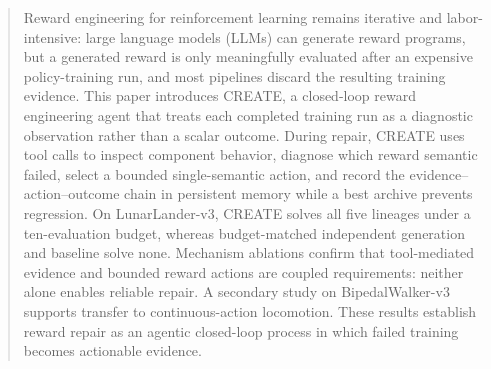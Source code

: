 \begin{abstract}
Reward engineering for reinforcement learning remains iterative and labor-intensive: large language models (LLMs) can generate reward programs, but a generated reward is only meaningfully evaluated after an expensive policy-training run, and most pipelines discard the resulting training evidence. This paper introduces CREATE, a closed-loop reward engineering agent that treats each completed training run as a diagnostic observation rather than a scalar outcome. During repair, CREATE uses tool calls to inspect component behavior, diagnose which reward semantic failed, select a bounded single-semantic action, and record the evidence--action--outcome chain in persistent memory while a best archive prevents regression. On LunarLander-v3, CREATE solves all five lineages under a ten-evaluation budget, whereas budget-matched independent generation and baseline solve none. Mechanism ablations confirm that tool-mediated evidence and bounded reward actions are coupled requirements: neither alone enables reliable repair. A secondary study on BipedalWalker-v3 supports transfer to continuous-action locomotion. These results establish reward repair as an agentic closed-loop process in which failed training becomes actionable evidence.
\end{abstract}
